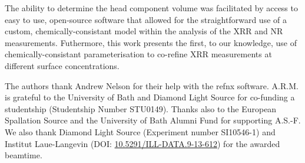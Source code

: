 \documentclass[amsmath,amssymb,twocolumn,superscriptaddress]{revtex4-1}
\begin{document}
The ability to determine the head component volume was facilitated by access to easy to use, open-source software that allowed for the straightforward use of a custom, chemically-consistant model within the analysis of the XRR and NR measurements. Futhermore, this work presents the first, to our knowledge, use of chemically-consistant parameterisation to co-refine XRR measurements at different surface concentrations.

\begin{acknowledgments}
The authors thank Andrew Nelson for their help with the refnx software.
A.R.M. is grateful to the University of Bath and Diamond Light Source for
co-funding a studentship (Studentship Number STU0149).
Thanks also to the European Spallation Source and the University of Bath
Alumni Fund for supporting A.S.-F.
We also thank Diamond Light Source (Experiment number SI10546-1) and
Institut Laue-Langevin (DOI:
\href{http://doi.org/10.5291/ILL-DATA.9-13-612}{10.5291/ILL-DATA.9-13-612})
for the awarded beamtime.
\end{acknowledgments}

\end{document}
